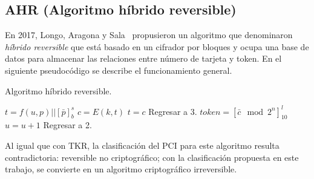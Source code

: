 %
%

\subsection{AHR (Algoritmo híbrido reversible)}

En 2017, Longo, Aragona y Sala~\cite{aragona} propusieron un algoritmo que
denominaron \textit{híbrido reversible} que está basado en un cifrador por
bloques y ocupa una base de datos para almacenar las relaciones entre número
de tarjeta y token. En el siguiente pseudocódigo se describe el
funcionamiento general.


\begin{algorithm}
  \caption{\label{cod_ahr} Algoritmo híbrido reversible.}
  \begin{algorithmic}[1]
      \State $ t = f(u, p) || [\bar{p}]^s_b $
      \State $ c = E(k, t) $
        \State $ t = c $
        \State Regresar a 3.
      \EndIf
      \State $ token = {[\bar{c} \mod 2^n]}^l_{10} $
        \State $ u = u + 1 $
        \State Regresar a 2.
      \EndIf
      \State {}
    \EndFunction
  \end{algorithmic}
\end{algorithm}

Al igual que con TKR, la clasificación del PCI para este algoritmo resulta
contradictoria: reversible no criptográfico; con la clasificación propuesta
en este trabajo, se convierte en un algoritmo criptográfico irreversible.
